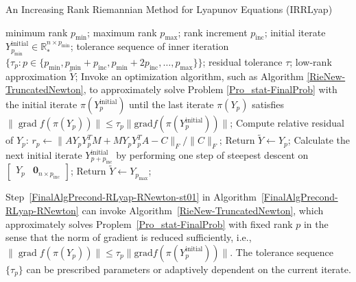 \documentclass[11pt]{article}
\newcommand{\zwhcomm}[2]{{\sf\color{purple} #1}{\sf\color{blue} #2}}
\numberwithin{equation}{section}
\DeclareMathOperator{\grad}{\mathrm{grad}}
\begin{document}
\begin{algorithm}[htbp]
  \caption{An Increasing Rank Riemannian Method for Lyapunov Equations (IRRLyap)} 
  \begin{algorithmic}[1] \label{FinalAlgPrecond-RLyap-RNewton}
  \REQUIRE minimum rank $p_{\min}$; maximum rank $p_{\max}$; rank increment $p_{\mathrm{inc}}$; initial iterate $Y_{p_{\min}}^{\mathrm{initial}} \in \mathbb{R}_*^{n\times p_{\min}}$; tolerance sequence of inner iteration $\{\tau_{p}:p \in \{ p_{\min}, p_{\min} + p_{\mathrm{inc}}, p_{\min} + 2 p_{\mathrm{inc}},\ldots, p_{\max} \} \}$; residual tolerance $\tau$;
  \ENSURE low-rank approximation $\widetilde{Y}$;
  \STATE \label{FinalAlgPrecond-RLyap-RNewton-st01} Invoke an optimization algorithm, such as Algorithm \ref{RieNew-TruncatedNewton}, to approximately solve Problem \eqref{Pro_stat-FinalProb} with the initial iterate $\pi(Y_p^{\mathrm{initial}})$ until the last iterate $\pi(Y_p)$ satisfies $\|\grad f(\pi(Y_p))\|\le \tau_{p} \|\mathrm{grad}f(\pi(Y_p^{\mathrm{initial}}))\|$;
  \STATE \label{FinalAlgPrecond-RLyap-RNewton-st02} Compute relative residual of $Y_p$: $r_p \gets \|AY_pY_p^TM + MY_pY_p^TA-C\|_F/\|C\|_F$; 
  \STATE \label{FinalAlgPrecond-RLyap-RNewton-st03} Return $\widetilde{Y}\gets Y_p$;
  \ELSE 
  \STATE \label{FinalAlgPrecond-RLyap-RNewton-st04} Calculate the next initial iterate $Y_{p+p_{\mathrm{inc}}}^{\mathrm{initial}}$ by performing one step of steepest descent on $\begin{bmatrix}
    Y_p & \mathbf{0}_{n\times p_{\text{inc}}}
  \end{bmatrix}$;
  \ENDIF
  \ENDFOR
  \STATE Return $\widetilde{Y}\gets Y_{p_{\max}}$;
 \end{algorithmic}
\end{algorithm}

Step~\ref{FinalAlgPrecond-RLyap-RNewton-st01} in Algorithm~\ref{FinalAlgPrecond-RLyap-RNewton} can invoke Algorithm~\ref{RieNew-TruncatedNewton}, which approximately solves Proplem~\eqref{Pro_stat-FinalProb} with fixed rank $p$ in the sense that the norm of gradient is reduced sufficiently, i.e., $\|\grad f(\pi(Y_p))\|\le \tau_{p} \|\mathrm{grad}f(\pi(Y_p^{\mathrm{initial}}))\|$. The tolerance sequence $\{\tau_p\}$ can be prescribed parameters or adaptively dependent on the current iterate.

\end{document}

